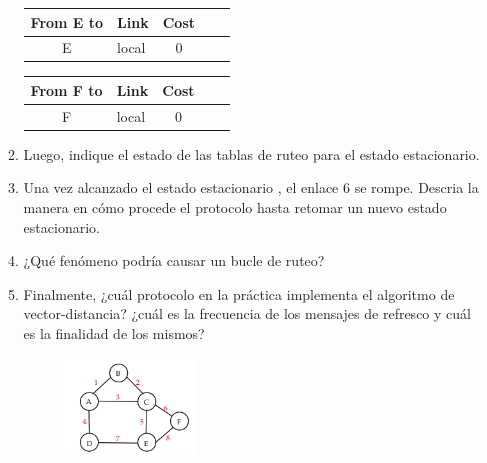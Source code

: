\begin{enumerate}
\begin{enumerate}
\begin{table}[H]
\begin{tabular}{@{}clcll@{}}
            \end{tabular}
            \hfill
            \begin{tabular}{@{}clcll@{}}
                \toprule
                From E to            & \multicolumn{1}{c}{Link} & Cost                 \\ \midrule
                E                    & local                    & 0                    \\ \bottomrule
            \end{tabular}
            \hfill
            \begin{tabular}{@{}clcll@{}}
                \toprule
                From F to            & \multicolumn{1}{c}{Link} & Cost                 \\ \midrule
                F                    & local                    & 0                    \\ \bottomrule
            \end{tabular}
            \vfill
        \end{table}


        \item Luego, indique el estado de las tablas de ruteo para el estado estacionario.
        \item Una vez alcanzado el estado estacionario , el enlace 6 se rompe. Descria la manera en c\'omo procede el protocolo hasta retomar
        un nuevo estado estacionario.
        \item ¿Qu\'e fen\'omeno podr\'ia causar un bucle de ruteo?
        \item Finalmente, ¿cu\'al protocolo en la pr\'actica implementa el algoritmo de vector-distancia? ¿cu\'al es la frecuencia de los mensajes
        de refresco y cu\'al es la finalidad de los mismos?

        \begin{figure}[H]
            \centering
            \includegraphics[width=0.35\textwidth]{img/Vector-distancia.png}
        \end{figure}
    \end{enumerate}


\end{enumerate}
